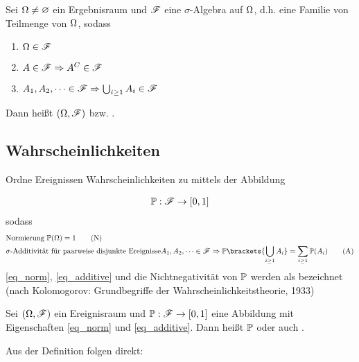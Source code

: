 \begin{definition}
	Sei $\Omega \neq \varnothing$ ein Ergebnisraum und $\mathscr F$ eine $\sigma$-Algebra auf $\Omega$, d.h. eine Familie von Teilmenge von $\Omega$, sodass
	\begin{enumerate}
		\item $\Omega \in \mathscr F$
		\item $A \in \mathscr{F} \Rightarrow A^C \in \mathscr F$
		\item $A_1, A_2, \dots \in \mathscr{F} \Rightarrow \bigcup_{i \ge 1} A_i \in \mathscr F$
	\end{enumerate}
	Dann heißt $(\Omega, \mathscr{F})$  bzw. .
\end{definition}

\subsection*{Wahrscheinlichkeiten}

Ordne Ereignissen Wahrscheinlichkeiten zu mittels der Abbildung

\begin{align}
	\mathbb{P}: \mathscr{F} \to [0,1]\notag
\end{align}
sodass
\begin{align}
	&\text{Normierung } \probp(\Omega) = 1 \label{eq_norm}\tag{N}\\
	&\sigma\text{-Additivität für paarweise disjunkte Ereignisse} 
	A_1, A_2, \dots \in \sigF \Rightarrow \probp\brackets{\bigcup_{i \ge 1} A_i} = \sum_{i \ge 1} \probp(A_i) \label{eq_additive}\tag{A}
\end{align}
\eqref{eq_norm}, \eqref{eq_additive} und die Nichtnegativität von $\mathbb{P}$ werden als  bezeichnet (nach Kolomogorov: Grundbegriffe der Wahrscheinlichkeitstheorie, 1933)

\begin{definition}
	Sei $(\Omega, \mathscr{F})$ ein Ereignisraum und $\mathbb{P}: \mathscr{F} \to [0,1]$ eine Abbildung mit Eigenschaften \eqref{eq_norm} und \eqref{eq_additive}. Dann heißt $\mathbb{P}$  oder auch .
\end{definition}

Aus der Definition folgen direkt:

